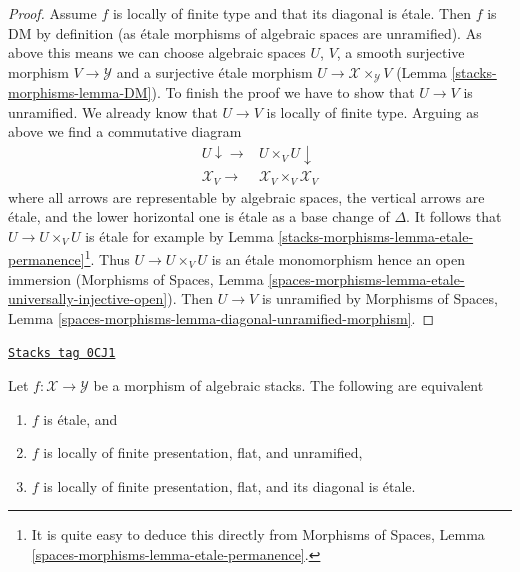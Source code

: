 \begin{proof}
\medskip\noindent
Assume $f$ is locally of finite type and that its diagonal is \'etale.
Then $f$ is DM by definition (as \'etale morphisms of algebraic spaces
are unramified). As above this means we can choose
algebraic spaces $U$, $V$, a smooth surjective morphism
$V \to \mathcal{Y}$ and a surjective \'etale morphism
$U \to \mathcal{X} \times_\mathcal{Y} V$ (Lemma \ref{stacks-morphisms-lemma-DM}).
To finish the proof we have to show that $U \to V$ is unramified.
We already know that $U \to V$ is locally of finite type.
Arguing as above we find a commutative diagram
$$
\begin{array}{cc}U \downarrow\longrightarrow & U \times_V U \downarrow \\ \mathcal{X}_V \longrightarrow & \mathcal{X}_V \times_V \mathcal{X}_V\end{array}
$$
where all arrows are representable by algebraic spaces,
the vertical arrows are \'etale, and the lower horizontal
one is \'etale as a base change of $\Delta$.
It follows that $U \to U \times_V U$ is \'etale
for example by Lemma \ref{stacks-morphisms-lemma-etale-permanence}\footnote{It is
quite easy to deduce this directly from
Morphisms of Spaces, Lemma \ref{spaces-morphisms-lemma-etale-permanence}.}.
Thus $U \to U \times_V U$ is an \'etale monomorphism
hence an open immersion (Morphisms of Spaces, Lemma
\ref{spaces-morphisms-lemma-etale-universally-injective-open}).
Then $U \to V$ is unramified by
Morphisms of Spaces, Lemma
\ref{spaces-morphisms-lemma-diagonal-unramified-morphism}.
\end{proof}

\begin{lemma}
\label{stacks-morphisms-lemma-characterize-etale}
\href{https://stacks.math.columbia.edu/tag/0CJ1}{\texttt{Stacks tag 0CJ1}}

Let $f : \mathcal{X} \to \mathcal{Y}$ be a morphism of algebraic stacks.
The following are equivalent
\begin{enumerate}
\item $f$ is \'etale, and
\item $f$ is locally of finite presentation, flat, and unramified,
\item $f$ is locally of finite presentation, flat, and its diagonal
is \'etale.
\end{enumerate}
\end{lemma}

